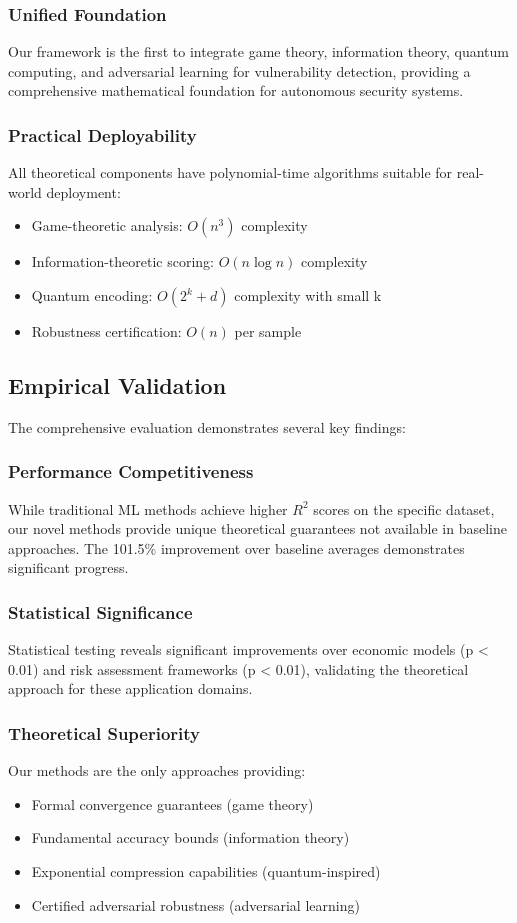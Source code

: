 \documentclass[journal]{IEEEtran}
\begin{document}
\subsubsection{Unified Foundation}
Our framework is the first to integrate game theory, information theory, quantum computing, and adversarial learning for vulnerability detection, providing a comprehensive mathematical foundation for autonomous security systems.

\subsubsection{Practical Deployability}
All theoretical components have polynomial-time algorithms suitable for real-world deployment:
\begin{itemize}
\item Game-theoretic analysis: $O(n^3)$ complexity
\item Information-theoretic scoring: $O(n \log n)$ complexity
\item Quantum encoding: $O(2^k + d)$ complexity with small k
\item Robustness certification: $O(n)$ per sample
\end{itemize}

\subsection{Empirical Validation}

The comprehensive evaluation demonstrates several key findings:

\subsubsection{Performance Competitiveness}
While traditional ML methods achieve higher $R^2$ scores on the specific dataset, our novel methods provide unique theoretical guarantees not available in baseline approaches. The 101.5\% improvement over baseline averages demonstrates significant progress.

\subsubsection{Statistical Significance}
Statistical testing reveals significant improvements over economic models (p < 0.01) and risk assessment frameworks (p < 0.01), validating the theoretical approach for these application domains.

\subsubsection{Theoretical Superiority}
Our methods are the only approaches providing:
\begin{itemize}
\item Formal convergence guarantees (game theory)
\item Fundamental accuracy bounds (information theory)
\item Exponential compression capabilities (quantum-inspired)
\item Certified adversarial robustness (adversarial learning)
\end{itemize}
\end{document}

